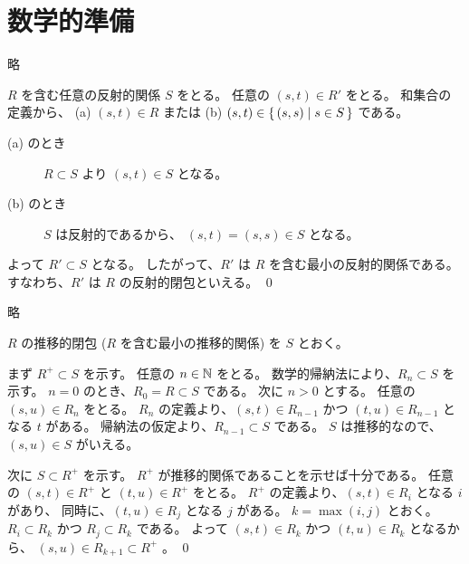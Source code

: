\chapter{数学的準備}

\begin{jexercise*}[2.2.6]
  略
\end{jexercise*}
\begin{jproof}
  $R$ を含む任意の反射的関係 $S$ をとる。
  任意の $(s, t) \in R'$ をとる。
  和集合の定義から、
    (a) $(s, t) \in R$ または
    (b) $(s, t) \in \{\,(s, s) \mid s \in S\,\}$
    である。
  \begin{description}
    \item[(a) のとき]
      $R \subset S$ より $(s, t) \in S$ となる。
    \item[(b) のとき]
      $S$ は反射的であるから、 $(s, t) = (s, s) \in S$ となる。
  \end{description}
  よって $R' \subset S$ となる。
  したがって、$R'$ は $R$ を含む最小の反射的関係である。
  すなわち、$R'$ は $R$ の反射的閉包といえる。
  \qed
\end{jproof}

\begin{jexercise*}[2.2.7]
  略
\end{jexercise*}
\begin{jproof}
  $R$ の推移的閉包 ($R$ を含む最小の推移的関係) を $S$ とおく。

  まず $R^+ \subset S$ を示す。
  任意の $n \in \mathbb{N}$ をとる。
  数学的帰納法により、$R_n \subset S$ を示す。
  $n = 0$ のとき、$R_0 = R \subset S$ である。
  次に $n > 0$ とする。
  任意の $(s, u) \in R_n$ をとる。
  $R_n$ の定義より、$(s, t) \in R_{n - 1}$ かつ $(t, u) \in R_{n - 1}$ となる $t$ がある。
  帰納法の仮定より、$R_{n - 1} \subset S$ である。
  $S$ は推移的なので、$(s, u) \in S$ がいえる。

  次に $S \subset R^+$ を示す。
  $R^+$ が推移的関係であることを示せば十分である。
  任意の $(s, t) \in R^+$ と $(t, u) \in R^+$ をとる。
  $R^+$ の定義より、$(s, t) \in R_i$ となる $i$ があり、
  同時に、$(t, u) \in R_j$ となる $j$ がある。
  $k = \max(i, j)$ とおく。
  $R_i \subset R_k$ かつ $R_j \subset R_k$ である。
  よって $(s, t) \in R_k$ かつ $(t, u) \in R_k$ となるから、
  $(s, u) \in R_{k + 1} \subset R^+$ 。
  \qed
\end{jproof}
